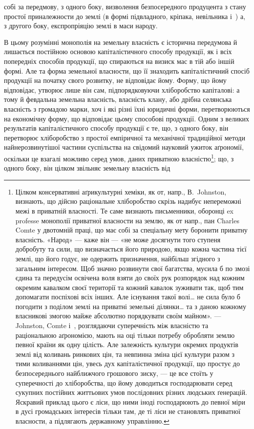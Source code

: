 \parcont{}  %
собі за передмову, з одного боку, визволення безпосередного продуцента з стану
простої приналежности до землі (в формі підвладного, кріпака, невільника і~)
а, з другого боку, експропріяцію землі в маси народу.

В цьому розумінні монополія на земельну власність є історична передумова й
лишається постійною основою капіталістичного способу продукції, як і всіх попередніх
способів продукції, що спираються на визиск мас в тій або іншій
формі. Але та форма земельної власности, що її знаходить капіталістичний
спосіб продукції на початку свого розвитку, не відповідає йому. Форму, що йому
відповідає, утворює лише він сам, підпорядковуючи хліборобство капіталові:
а тому й февдальна земельна власність, власність клану, або дрібна селянська
власність з громадою марки, хоч і які різні їхні юридичні форми,
перетворюються на економічну форму, що відповідає цьому способові продукції.
Одним з великих результатів капіталістичного способу продукції є те, що, з одного
боку, він перетворює хліборобство з простої емпіричної та механічної
традиційної методи найнерозвинутішої частини суспільства на свідомий науковий
ужиток аґрономії, оскільки це взагалі можливо серед умов, даних приватною
власністю\footnote{
Цілком консервативні аґрикультурні хеміки, як от, напр., В.~Johnston, визнають, що дійсно
раціональне хліборобство скрізь надибує непереможні межі в приватній власності. Те саме визнають
письменники, оборонці ex professe монополії приватної власности на землю, як от напр., пан Charles
Comte у двотомній праці, що має собі за спеціальну мету боронити приватну власність. «Народ» — каже
він — «не може досягнути того ступеня добробуту та сили, що визначається його природою, якщо
кожна частина тієї землі, що його годує, не одержить призначення, найбільш згідного з загальним
інтересом. Щоб значно розвинути свої багатства, мусила б по змозі єдина та передусім освічена воля
взяти до своїх рук розпорядок над кожним окремим кавалком своєї території та кожний кавалок зуживати
так, щоб тим допомагати поспіхові всіх інших. Але існування такої волі\dots{} не сила було б погодити
з поділом землі на приватні земельні ділянки\dots{} та з даною кожному власникові змогою майже абсолютно
порядкувати своїм майном». — Johnston, Comte і~, розглядаючи суперечність між власністю та
раціональною аґрономією, мають на оці тільки потребу обробляти землю певної країни як одну цілість.
Але залежність культури окремих продуктів землі від коливань ринкових цін, та невпинна зміна цієї
культури разом з тими коливаннями цін, увесь дух капіталістичної продукції, що простує до
безпосереднього
найближчого грошового зиску, — це все стоїть у суперечності до хліборобства, що йому
доводиться господарювати серед сукупних постійних життьових умов послідовних різних людських
ґенерацій.
Яскравий приклад цього є ліси, що ними іноді господарюють до певної міри в дусі громадських
інтересів
тільки там, де ті ліси не становлять приватної власности, а підлягають державному управлінню.
}; що, з одного боку, він цілком звільняє земельну власність від
